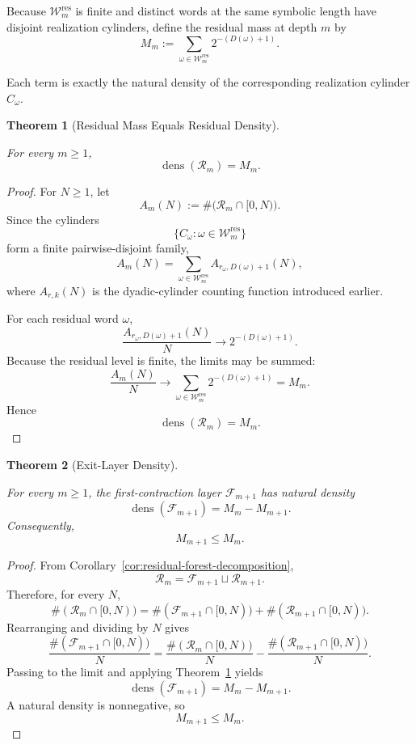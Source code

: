 \documentclass[12pt, oneside]{article}
\numberwithin{equation}{section}
\theoremstyle{definition}
\theoremstyle{plain}
\newtheorem{theorem}{Theorem}[section]
\theoremstyle{remark}
\begin{document}
Because \(\mathcal W_m^{\mathrm{res}}\) is finite and distinct words at the
same symbolic length have disjoint realization cylinders, define the
residual mass at depth \(m\) by
\[
M_m
:=
\sum_{\omega\in\mathcal W_m^{\mathrm{res}}}
2^{-(D(\omega)+1)}.
\]

Each term is exactly the natural density of the corresponding realization
cylinder \(C_\omega\).

\begin{theorem}[Residual Mass Equals Residual Density]
\label{thm:residual-mass-density}

For every \(m\ge1\),
\[
\boxed{
\operatorname{dens}(\mathcal R_m)=M_m.
}
\]
\end{theorem}

\begin{proof}
For \(N\ge1\), let
\[
A_m(N)
:=
\#\bigl(\mathcal R_m\cap[0,N)\bigr).
\]
Since the cylinders
\[
\{C_\omega:\omega\in\mathcal W_m^{\mathrm{res}}\}
\]
form a finite pairwise-disjoint family,
\[
A_m(N)
=
\sum_{\omega\in\mathcal W_m^{\mathrm{res}}}
A_{r_\omega,D(\omega)+1}(N),
\]
where \(A_{r,k}(N)\) is the dyadic-cylinder counting function introduced
earlier.

For each residual word \(\omega\),
\[
\frac{A_{r_\omega,D(\omega)+1}(N)}{N}
\longrightarrow
2^{-(D(\omega)+1)}.
\]
Because the residual level is finite, the limits may be summed:
\[
\frac{A_m(N)}{N}
\longrightarrow
\sum_{\omega\in\mathcal W_m^{\mathrm{res}}}
2^{-(D(\omega)+1)}
=
M_m.
\]
Hence
\[
\operatorname{dens}(\mathcal R_m)=M_m.
\]
\end{proof}

\begin{theorem}[Exit-Layer Density]
\label{thm:first-contraction-layer-density}

For every \(m\ge1\), the first-contraction layer \(\mathcal F_{m+1}\) has
natural density
\[
\boxed{
\operatorname{dens}(\mathcal F_{m+1})
=
M_m-M_{m+1}.
}
\]
Consequently,
\[
M_{m+1}\le M_m.
\]
\end{theorem}

\begin{proof}
From Corollary~\ref{cor:residual-forest-decomposition},
\[
\mathcal R_m
=
\mathcal F_{m+1}
\sqcup
\mathcal R_{m+1}.
\]
Therefore, for every \(N\),
\[
\#(\mathcal R_m\cap[0,N))
=
\#(\mathcal F_{m+1}\cap[0,N))
+
\#(\mathcal R_{m+1}\cap[0,N)).
\]
Rearranging and dividing by \(N\) gives
\[
\frac{\#(\mathcal F_{m+1}\cap[0,N))}{N}
=
\frac{\#(\mathcal R_m\cap[0,N))}{N}
-
\frac{\#(\mathcal R_{m+1}\cap[0,N))}{N}.
\]
Passing to the limit and applying
Theorem~\ref{thm:residual-mass-density} yields
\[
\operatorname{dens}(\mathcal F_{m+1})
=
M_m-M_{m+1}.
\]
A natural density is nonnegative, so
\[
M_{m+1}\le M_m.
\]
\end{proof}
\end{document}
